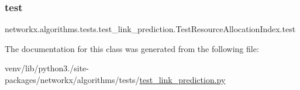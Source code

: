\subsubsection{\texorpdfstring{test}{test}}
{\footnotesize\ttfamily networkx.\+algorithms.\+tests.\+test\+\_\+link\+\_\+prediction.\+Test\+Resource\+Allocation\+Index.\+test}



The documentation for this class was generated from the following file\+:\begin{DoxyCompactItemize}
\item 
venv/lib/python3./site-\/packages/networkx/algorithms/tests/\hyperlink{test__link__prediction_8py}{test\+\_\+link\+\_\+prediction.\+py}\end{DoxyCompactItemize}
